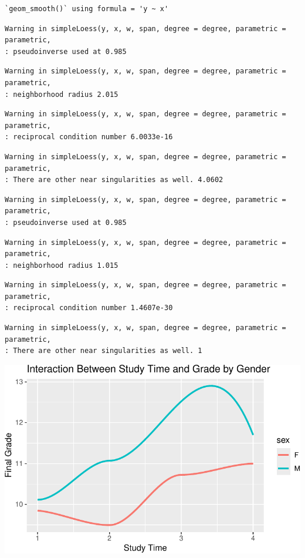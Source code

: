 \documentclass[
  10pt,
]{article}
\begin{document}
\begin{verbatim}
`geom_smooth()` using formula = 'y ~ x'
\end{verbatim}

\begin{verbatim}
Warning in simpleLoess(y, x, w, span, degree = degree, parametric = parametric,
: pseudoinverse used at 0.985
\end{verbatim}

\begin{verbatim}
Warning in simpleLoess(y, x, w, span, degree = degree, parametric = parametric,
: neighborhood radius 2.015
\end{verbatim}

\begin{verbatim}
Warning in simpleLoess(y, x, w, span, degree = degree, parametric = parametric,
: reciprocal condition number 6.0033e-16
\end{verbatim}

\begin{verbatim}
Warning in simpleLoess(y, x, w, span, degree = degree, parametric = parametric,
: There are other near singularities as well. 4.0602
\end{verbatim}

\begin{verbatim}
Warning in simpleLoess(y, x, w, span, degree = degree, parametric = parametric,
: pseudoinverse used at 0.985
\end{verbatim}

\begin{verbatim}
Warning in simpleLoess(y, x, w, span, degree = degree, parametric = parametric,
: neighborhood radius 1.015
\end{verbatim}

\begin{verbatim}
Warning in simpleLoess(y, x, w, span, degree = degree, parametric = parametric,
: reciprocal condition number 1.4607e-30
\end{verbatim}

\begin{verbatim}
Warning in simpleLoess(y, x, w, span, degree = degree, parametric = parametric,
: There are other near singularities as well. 1
\end{verbatim}

\includegraphics{551-HW-Q3_files/figure-pdf/unnamed-chunk-2-1.pdf}
\end{document}
